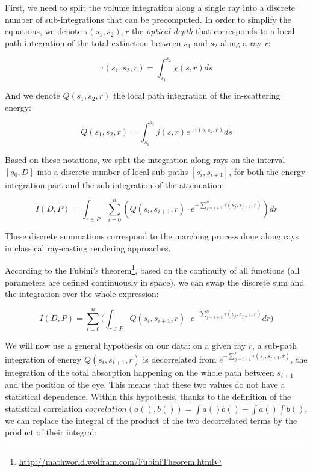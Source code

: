 First, we need to split the volume integration along a single ray into a discrete number of sub-integrations that can be precomputed. In order to simplify the equations, we denote $\tau(s_1,s_2),r$ the \textit{optical depth} that corresponds to a local path integration of the total extinction between $s_1$ and $s_2$ along a ray $r$:

\begin{equation*}
	\tau(s_1,s_2,r)=\int^{s_2}_{s_1}\chi(s,r)ds
\end{equation*}

And we denote $Q(s_1,s_2,r)$ the local path integration of the in-scattering energy:

\begin{equation*}
	Q(s_1,s_2,r)=\int^{s_2}_{s_1}j(s,r)e^{-\tau(s,s_2,r)}ds
\end{equation*}

Based on these notations, we split the integration along rays on the interval $[s_0,D]$ into a discrete number of local sub-paths $[s_i,s_{i+1}]$, for both the energy integration part and the sub-integration of the attenuation:

\begin{equation*}
	I(D,P)=\int_{r\in P}\sum^{n}_{i=0}(Q(s_i,s_{i+1},r)\cdot e^{-\sum^{n}_{j=i+1}\tau(s_j,s_{j+1},r)})dr
\end{equation*}

These discrete summations correspond to the marching process done along rays in classical ray-casting rendering approaches.

According to the Fubini's theorem\footnote{\url{http://mathworld.wolfram.com/FubiniTheorem.html}}, based on the continuity of all functions (all parameters are defined continuously in space), we can swap the discrete sum and the integration over the whole expression:

\begin{equation*}
	I(D,P)=\sum^{n}_{i=0}\Bigg( \int_{r\in P}Q(s_i,s_{i+1},r)\cdot e^{-\sum^{n}_{j=i+1}\tau(s_j,s_{j+1},r)}dr\Bigg)
\end{equation*}

We will now use a general hypothesis on our data: on a given ray $r$, a sub-path integration of energy $Q(s_i,s_{i+1},r)$ is decorrelated from $e^{-\sum^{n}_{j=i+1}\tau(s_j,s_{j+1},r)}$, the integration of the total absorption happening on the whole path between $s_{i+1}$ and the position of the eye. This means that these two values do not have a statistical dependence. Within this hypothesis, thanks to the definition of the statistical correlation $correlation(a(),b())=\int a()b()-\int a()\int b()$, we can replace the integral of the product of the two decorrelated terms by the product of their integral:

